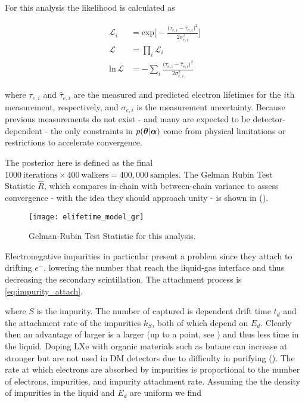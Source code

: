 For this analysis the likelihood is calculated as

\begin{equation}
\begin{aligned}
\mathcal{L}_i &= \mathrm{exp} \Bigg[ -\frac{\big(\tau_{e, i} - \hat{\tau}_{e, i} \big)^2}{2 \sigma_{e, i}^2} \Bigg] \\
\mathcal{L} &= \prod_i \mathcal{L}_i \\
\mathrm{ln}\, \mathcal{L} &= -\sum_i \frac{\big(\tau_{e, i} -
\hat{\tau}_{e, i} \big)^2}{2 \sigma_{e, i}^2}
\end{aligned}
\end{equation}

\noindent where $\tau_{e, i}$ and $\hat{\tau}_{e, i}$ are the measured and predicted electron
lifetimes for the $i$th measurement, respectively, and $\sigma_{e, i}$ is the measurement uncertainty.  Because previous measurements do
not exist - and many are expected to be detector-dependent - the only constraints in $p(\boldsymbol{\theta}|\boldsymbol{\alpha})$ come from physical
limitations or restrictions to accelerate convergence.

The posterior here is defined as the final $1000\ \mathrm{iterations} \times 400\ \mathrm{walkers} = 400,000\ \mathrm{samples}$.  The
Gelman Rubin Test Statistic $\hat{R}$, which compares in-chain with between-chain variance to assess convergence - with the idea they
should approach unity - is shown in
 ().

\begin{figure}
\centering
\texttt{[image: elifetime\_model\_gr]}
\caption{Gelman-Rubin Test Statistic for this analysis.}
\label{fig:elifetime_fit_results_gr}
\end{figure}

Electronegative impurities
in particular present a problem
since they attach to drifting $e^{-}$,
lowering the number that reach the liquid-gas interface and thus decreasing the secondary scintillation.  The attachment process
is \eqref{eq:impurity_attach}.

\noindent where $S$ is the impurity.  The number of \electron captured is dependent drift time $t_{d}$ and the
attachment rate of
the impurities $k_{S}$, both of which depend on $E_{d}$.  Clearly then an advantage of larger
\efields is a larger
\vd (up to a point, see ) and thus less time in the liquid.  Doping LXe with organic materials such as butane
can increase \vd at stronger
\efields but are not used in DM detectors due to difficulty in purifying ().  The rate at which electrons are
absorbed by impurities is proportional to the number of electrons, impurities, and impurity attachment rate.  Assuming the the density
of impurities in the liquid and $E_{d}$ are uniform we find

